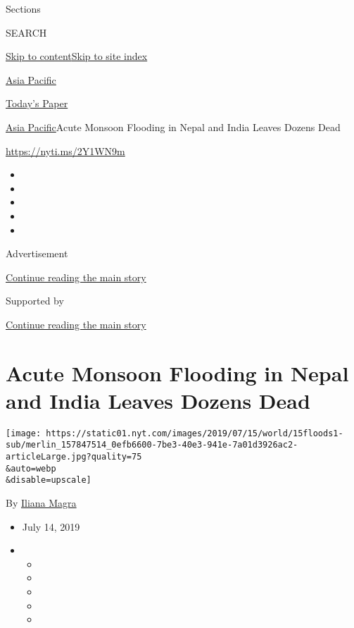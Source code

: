 Sections

SEARCH

\protect\hyperlink{site-content}{Skip to
content}\protect\hyperlink{site-index}{Skip to site index}

\href{https://www.nytimes.com/section/world/asia}{Asia Pacific}

\href{https://myaccount.nytimes.com/auth/login?response_type=cookie\&client_id=vi}{}

\href{https://www.nytimes.com/section/todayspaper}{Today's Paper}

\href{/section/world/asia}{Asia Pacific}\textbar{}Acute Monsoon Flooding
in Nepal and India Leaves Dozens Dead

\url{https://nyti.ms/2Y1WN9m}

\begin{itemize}
\item
\item
\item
\item
\item
\end{itemize}

Advertisement

\protect\hyperlink{after-top}{Continue reading the main story}

Supported by

\protect\hyperlink{after-sponsor}{Continue reading the main story}

\hypertarget{acute-monsoon-flooding-in-nepal-and-india-leaves-dozens-dead}{%
\section{Acute Monsoon Flooding in Nepal and India Leaves Dozens
Dead}\label{acute-monsoon-flooding-in-nepal-and-india-leaves-dozens-dead}}

\texttt{[image: https://static01.nyt.com/images/2019/07/15/world/15floods1-sub/merlin\_157847514\_0efb6600-7be3-40e3-941e-7a01d3926ac2-articleLarge.jpg?quality=75\\\&auto=webp\\\&disable=upscale]}

By \href{https://www.nytimes.com/by/iliana-magra}{Iliana Magra}

\begin{itemize}
\item
  July 14, 2019
\item
  \begin{itemize}
  \item
  \item
  \item
  \item
  \item
  \end{itemize}
\end{itemize}

